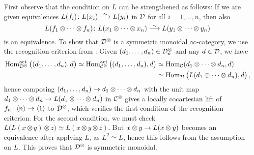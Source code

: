 \begin{proof*}
	First observe that the condition on $L$ can be strengthened as follows: If we are given equivalences $L(f_i)\colon L(x_i)\isomorphism L(y_i)$ in $\mathcal{D}$ for all $i=1,\dotsc,n$, then also
	\begin{equation*}
		L(f_1\otimes\dotsb\otimes f_n)\colon L(x_1\otimes\dotsb\otimes x_n)\isomorphism L(y_1\otimes\dotsb\otimes y_n)
	\end{equation*}
	is an equivalence. To show that $\mathcal{D}^\otimes$ is a symmetric monoidal $\infty$-category, we use the recognition criterion from : Given $(d_1,\dotsc,d_n)\in\mathcal{D}_n^\otimes$ and any $d\in \mathcal{D}$, we have
	\begin{align*}
		\operatorname{Hom}_{\mathcal{D}^\otimes}^\mathrm{act}\big((d_1,\dotsc,d_n),d\big)\simeq \operatorname{Hom}_{\mathcal{C}^\otimes}^\mathrm{act}\big((d_1,\dotsc,d_n),d\big)
		&\simeq \operatorname{Hom}_{\mathcal{C}}(d_1\otimes\dotsb\otimes d_n,d)\\
		&\simeq \operatorname{Hom}_{\mathcal{D}}\big(L(d_1\otimes\dotsb\otimes d_n),d\big)\,,
	\end{align*}
	hence composing $(d_1,\dotsc,d_n)\morphism d_1\otimes\dotsb\otimes d_n$ with the unit map $ d_1\otimes\dotsb\otimes d_n\morphism L(d_1\otimes\dotsb\otimes d_n)$ in $\mathcal{C}^\otimes$ gives a locally cocartesian lift of $f_n\colon \langle n\rangle \morphism\langle 1\rangle$ to $\mathcal{D}^\otimes$, which verifies the first condition of the recognition criterion. For the second condition, we must check $L(L(x\otimes y)\otimes z\big)\simeq L(x\otimes y\otimes z)$. But $x\otimes y\morphism L(x\otimes y)$ becomes an equivalence after applying $L$, as $L^2\simeq L$, hence this follows from the assumption on $L$. This proves that $\mathcal{D}^\otimes$ is symmetric monoidal.
	

\end{proof*}

